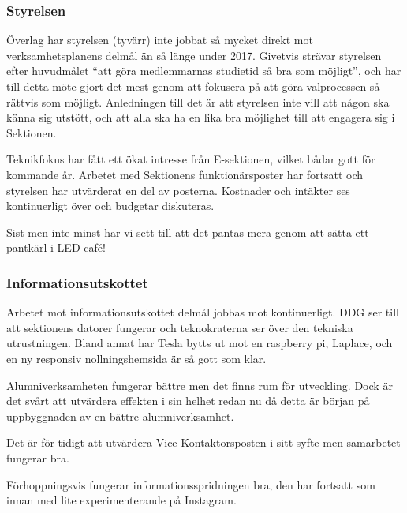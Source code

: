 \documentclass[../_main/handlingar.tex]{subfiles}
\begin{document}

\subsubsection*{Styrelsen}
Överlag har styrelsen (tyvärr) inte jobbat så mycket direkt mot verksamhetsplanens delmål än så länge under 2017. Givetvis strävar styrelsen efter huvudmålet ``att göra medlemmarnas studietid så bra som möjligt'', och har till detta möte gjort det mest genom att fokusera på att göra valprocessen så rättvis som möjligt. Anledningen till det är att styrelsen inte vill att någon ska känna sig utstött, och att alla ska ha en lika bra möjlighet till att engagera sig i Sektionen.

Teknikfokus har fått ett ökat intresse från E-sektionen, vilket bådar gott för kommande år. Arbetet med Sektionens funktionärsposter har fortsatt och styrelsen har utvärderat en del av posterna. Kostnader och intäkter ses kontinuerligt över och budgetar diskuteras.

Sist men inte minst har vi sett till att det pantas mera genom att sätta ett pantkärl i LED-café!

\subsubsection*{Informationsutskottet}
Arbetet mot informationsutskottet delmål jobbas mot kontinuerligt. DDG ser till att sektionens datorer fungerar och teknokraterna ser över den tekniska utrustningen. Bland annat har Tesla bytts ut mot en raspberry pi, Laplace, och en ny responsiv nollningshemsida är så gott som klar.

Alumniverksamheten fungerar bättre men det finns rum för utveckling. Dock är det svårt att utvärdera effekten i sin helhet redan nu då detta är början på uppbyggnaden av en bättre alumniverksamhet.

Det är för tidigt att utvärdera Vice Kontaktorsposten i sitt syfte men samarbetet fungerar bra.

Förhoppningsvis fungerar informationsspridningen bra, den har fortsatt som innan med lite experimenterande på Instagram.
\end{document}
